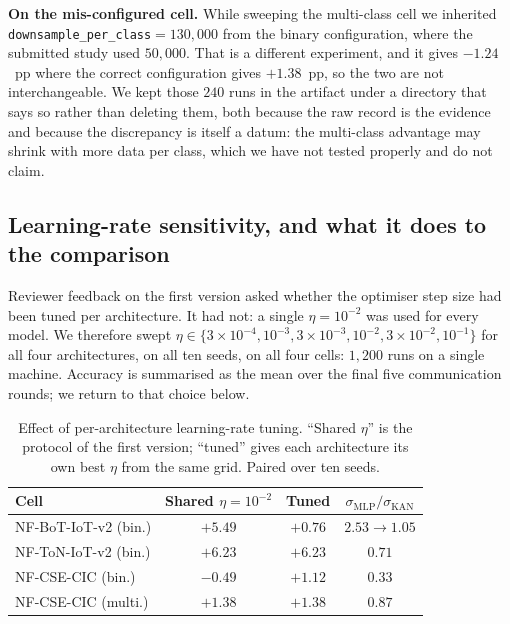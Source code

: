 \textbf{On the mis-configured cell.} While sweeping the multi-class cell we inherited
\texttt{downsample\_per\_class}${=}130{,}000$ from the binary configuration, where the submitted
study used $50{,}000$. That is a different experiment, and it gives $-1.24$~pp where the correct
configuration gives $+1.38$~pp, so the two are not interchangeable. We kept those $240$ runs in
the artifact under a directory that says so rather than deleting them, both because the raw
record is the evidence and because the discrepancy is itself a datum: the multi-class advantage
may shrink with more data per class, which we have not tested properly and do not claim.

\subsection{Learning-rate sensitivity, and what it does to the comparison}\label{sec:lrsweep}

Reviewer feedback on the first version asked whether the optimiser step size had been tuned
per architecture. It had not: a single $\eta=10^{-2}$ was used for every model. We therefore
swept $\eta \in \{3\!\times\!10^{-4}, 10^{-3}, 3\!\times\!10^{-3}, 10^{-2}, 3\!\times\!10^{-2},
10^{-1}\}$ for all four architectures, on all ten seeds, on all four cells: $1{,}200$ runs on
a single machine. Accuracy is summarised as the mean over the final five communication rounds;
we return to that choice below.

\begin{table}[t]
\caption{Effect of per-architecture learning-rate tuning. ``Shared $\eta$'' is the protocol of
the first version; ``tuned'' gives each architecture its own best $\eta$ from the same grid.
Paired over ten seeds.}
\label{tab:lrsweep}
\centering
\footnotesize
\begin{tabular}{@{}lccc@{}}
\toprule
Cell & Shared $\eta{=}10^{-2}$ & Tuned & $\sigma_{\mathrm{MLP}}/\sigma_{\mathrm{KAN}}$ \\
\midrule
NF-BoT-IoT-v2 (bin.)      & $+5.49$ & $+0.76$ & $2.53 \rightarrow 1.05$ \\
NF-ToN-IoT-v2 (bin.)      & $+6.23$ & $+6.23$ & $0.71$ \\
NF-CSE-CIC (bin.)         & $-0.49$ & $+1.12$ & $0.33$ \\
NF-CSE-CIC (multi.)       & $+1.38$ & $+1.38$ & $0.87$ \\
\bottomrule
\end{tabular}
\end{table}

